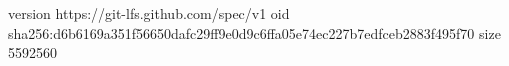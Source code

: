 version https://git-lfs.github.com/spec/v1
oid sha256:d6b6169a351f56650dafc29ff9e0d9c6ffa05e74ec227b7edfceb2883f495f70
size 5592560
